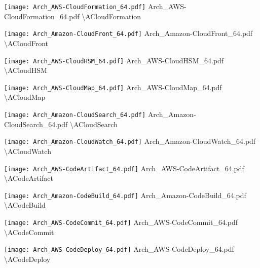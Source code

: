  {\texttt{[image: Arch\_AWS-CloudFormation\_64.pdf]}} {Arch\_AWS-CloudFormation\_64.pdf} {{\textbackslash}ACloudFormation}

 {\texttt{[image: Arch\_Amazon-CloudFront\_64.pdf]}} {Arch\_Amazon-CloudFront\_64.pdf} {{\textbackslash}ACloudFront}

 {\texttt{[image: Arch\_AWS-CloudHSM\_64.pdf]}} {Arch\_AWS-CloudHSM\_64.pdf} {{\textbackslash}ACloudHSM}

 {\texttt{[image: Arch\_AWS-CloudMap\_64.pdf]}} {Arch\_AWS-CloudMap\_64.pdf} {{\textbackslash}ACloudMap}

 {\texttt{[image: Arch\_Amazon-CloudSearch\_64.pdf]}} {Arch\_Amazon-CloudSearch\_64.pdf} {{\textbackslash}ACloudSearch}

 {\texttt{[image: Arch\_Amazon-CloudWatch\_64.pdf]}} {Arch\_Amazon-CloudWatch\_64.pdf} {{\textbackslash}ACloudWatch}

 {\texttt{[image: Arch\_AWS-CodeArtifact\_64.pdf]}} {Arch\_AWS-CodeArtifact\_64.pdf} {{\textbackslash}ACodeArtifact}

 {\texttt{[image: Arch\_Amazon-CodeBuild\_64.pdf]}} {Arch\_Amazon-CodeBuild\_64.pdf} {{\textbackslash}ACodeBuild}

 {\texttt{[image: Arch\_AWS-CodeCommit\_64.pdf]}} {Arch\_AWS-CodeCommit\_64.pdf} {{\textbackslash}ACodeCommit}

 {\texttt{[image: Arch\_AWS-CodeDeploy\_64.pdf]}} {Arch\_AWS-CodeDeploy\_64.pdf} {{\textbackslash}ACodeDeploy}

